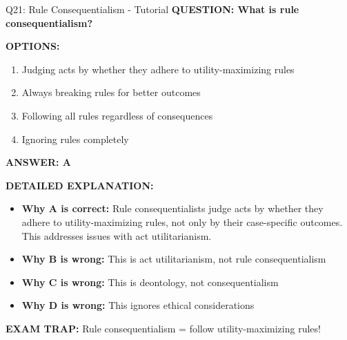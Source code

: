 \documentclass[8pt]{beamer}
\begin{document}
	\begin{frame}{Q21: Rule Consequentialism - Tutorial}
		\fontsize{6.5}{7.5}\selectfont
		\textbf{QUESTION: What is rule consequentialism?}
		
		\vspace{0.1cm}
		\textbf{OPTIONS:}
		\begin{enumerate}
			\item Judging acts by whether they adhere to utility-maximizing rules
			\item Always breaking rules for better outcomes
			\item Following all rules regardless of consequences
			\item Ignoring rules completely
		\end{enumerate}
		
		\vspace{0.1cm}
		\textcolor{myblue}{\textbf{ANSWER: A}}
		
		\vspace{0.1cm}
		\textbf{DETAILED EXPLANATION:}
		\begin{itemize}
			\item \textbf{Why A is correct:} Rule consequentialists judge acts by whether they adhere to utility-maximizing rules, not only by their case-specific outcomes. This addresses issues with act utilitarianism.
			\item \textbf{Why B is wrong:} This is act utilitarianism, not rule consequentialism
			\item \textbf{Why C is wrong:} This is deontology, not consequentialism
			\item \textbf{Why D is wrong:} This ignores ethical considerations
		\end{itemize}
		
		\textcolor{myred}{\textbf{EXAM TRAP:}} Rule consequentialism = \textcolor{myblue}{follow utility-maximizing rules}!
	\end{frame}
	
\end{document}
